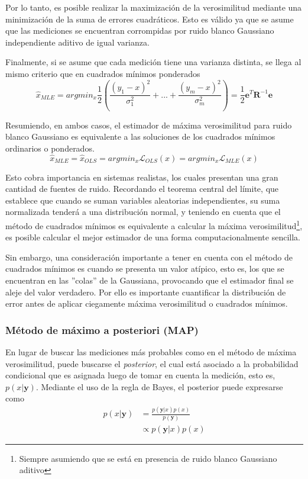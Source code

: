 Por lo tanto, es posible realizar la maximización de la verosimilitud mediante una minimización de la suma de errores cuadráticos. Esto es válido ya que se asume que las mediciones se encuentran corrompidas por ruido blanco Gaussiano independiente aditivo de igual varianza.

Finalmente, si se asume que cada medición tiene una varianza distinta, se llega al mismo criterio que en cuadrados mínimos ponderados
\begin{equation}
    \hat{x}_{MLE} = argmin_x \frac{1}{2}\left(\frac{(y_1-x)^2}{\sigma_1^2}+...+\frac{(y_m-x)^2}{\sigma_m^2}\right) =\frac{1}{2} \bm{e}^T\bm{R}^{-1}\bm{e}
    \label{eq:mlewls}
\end{equation}

Resumiendo, en ambos casos, el estimador de máxima verosimilitud para ruido blanco Gaussiano es equivalente a las soluciones de los cuadrados mínimos ordinarios o ponderados.
\begin{equation}
    \hat{x}_{MLE} = \hat{x}_{OLS} = argmin_x\mathscr{L}_{OLS}(x) = argmin_x\mathscr{L}_{MLE}(x)
\end{equation}

Esto cobra importancia en sistemas realistas, los cuales presentan una gran cantidad de fuentes de ruido. Recordando el teorema central del límite, que establece que cuando se suman variables aleatorias independientes, su suma normalizada tenderá a una distribución normal, y teniendo en cuenta que el método de cuadrados mínimos es equivalente a calcular la máxima verosimilitud\footnote{Siempre asumiendo que se está en presencia de ruido blanco Gaussiano aditivo}, es posible calcular el mejor estimador de una forma computacionalmente sencilla.

Sin embargo, una consideración importante a tener en cuenta con el método de cuadrados mínimos es cuando se presenta un valor atípico, esto es, los que se encuentran en las ''colas'' de la Gaussiana, provocando que el estimador final se aleje del valor verdadero. Por ello es importante cuantificar la distribución de error antes de aplicar ciegamente máxima verosimilitud o cuadrados mínimos.

\subsubsection{Método de máximo a posteriori (MAP)}
En lugar de buscar las mediciones más probables como en el método de máxima verosimilitud, puede buscarse el \textit{posterior}, el cual está asociado a la probabilidad condicional que es asignada luego de tomar en cuenta la medición, esto es, $p(x|\bm{y})$. Mediante el uso de la regla de Bayes, el posterior puede expresarse como
\begin{align}
    p(x|\bm{y}) &= \frac{p(\bm{y}|x)p(x)}{p(\bm{y})} \\
    &\propto p(\bm{y}|x)p(x)
\end{align}

